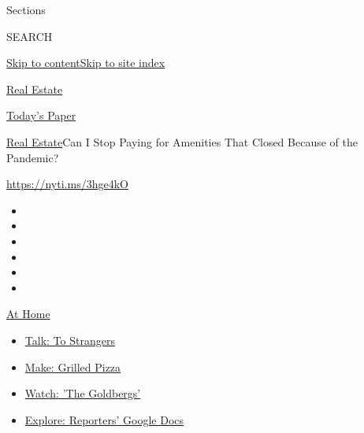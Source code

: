 Sections

SEARCH

\protect\hyperlink{site-content}{Skip to
content}\protect\hyperlink{site-index}{Skip to site index}

\href{https://www.nytimes.com/section/realestate}{Real Estate}

\href{https://myaccount.nytimes.com/auth/login?response_type=cookie\&client_id=vi}{}

\href{https://www.nytimes.com/section/todayspaper}{Today's Paper}

\href{/section/realestate}{Real Estate}\textbar{}Can I Stop Paying for
Amenities That Closed Because of the Pandemic?

\url{https://nyti.ms/3hge4kO}

\begin{itemize}
\item
\item
\item
\item
\item
\item
\end{itemize}

\href{https://www.nytimes.com/spotlight/at-home?action=click\&pgtype=Article\&state=default\&region=TOP_BANNER\&context=at_home_menu}{At
Home}

\begin{itemize}
\tightlist
\item
  \href{https://www.nytimes.com/2020/08/03/well/family/the-benefits-of-talking-to-strangers.html?action=click\&pgtype=Article\&state=default\&region=TOP_BANNER\&context=at_home_menu}{Talk:
  To Strangers}
\item
  \href{https://www.nytimes.com/2020/08/01/at-home/coronavirus-make-pizza-on-a-grill.html?action=click\&pgtype=Article\&state=default\&region=TOP_BANNER\&context=at_home_menu}{Make:
  Grilled Pizza}
\item
  \href{https://www.nytimes.com/2020/07/31/arts/television/goldbergs-abc-stream.html?action=click\&pgtype=Article\&state=default\&region=TOP_BANNER\&context=at_home_menu}{Watch:
  'The Goldbergs'}
\item
  \href{https://www.nytimes.com/interactive/2020/at-home/even-more-reporters-editors-diaries-lists-recommendations.html?action=click\&pgtype=Article\&state=default\&region=TOP_BANNER\&context=at_home_menu}{Explore:
  Reporters' Google Docs}
\end{itemize}

